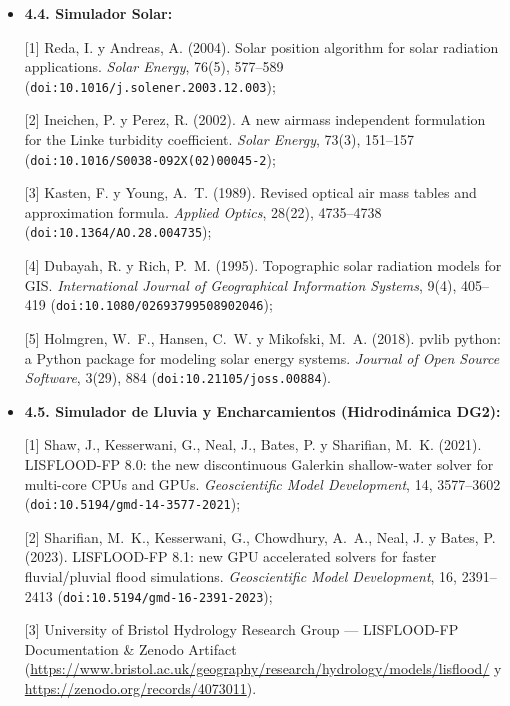 \documentclass[11pt,a4paper]{article}
\begin{document}
{\begin{itemize}
    [4] Hanks, T.~C. y Kanamori, H. (1979). A moment magnitude scale. \emph{Journal of Geophysical Research}, 84(B5), 2348--2350.

    \item \textbf{4.4. Simulador Solar:}

    [1] Reda, I. y Andreas, A. (2004). Solar position algorithm for solar radiation applications. \emph{Solar Energy}, 76(5), 577--589 (\texttt{doi:10.1016/j.solener.2003.12.003});

    [2] Ineichen, P. y Perez, R. (2002). A new airmass independent formulation for the Linke turbidity coefficient. \emph{Solar Energy}, 73(3), 151--157 (\texttt{doi:10.1016/S0038-092X(02)00045-2});

    [3] Kasten, F. y Young, A.~T. (1989). Revised optical air mass tables and approximation formula. \emph{Applied Optics}, 28(22), 4735--4738 (\texttt{doi:10.1364/AO.28.004735});

    [4] Dubayah, R. y Rich, P.~M. (1995). Topographic solar radiation models for GIS. \emph{International Journal of Geographical Information Systems}, 9(4), 405--419 (\texttt{doi:10.1080/02693799508902046});

    [5] Holmgren, W.~F., Hansen, C.~W. y Mikofski, M.~A. (2018). pvlib python: a Python package for modeling solar energy systems. \emph{Journal of Open Source Software}, 3(29), 884 (\texttt{doi:10.21105/joss.00884}).

    \item \textbf{4.5. Simulador de Lluvia y Encharcamientos (Hidrodin\'amica DG2):}

    [1] Shaw, J., Kesserwani, G., Neal, J., Bates, P. y Sharifian, M.~K. (2021). LISFLOOD-FP 8.0: the new discontinuous Galerkin shallow-water solver for multi-core CPUs and GPUs. \emph{Geoscientific Model Development}, 14, 3577--3602 (\texttt{doi:10.5194/gmd-14-3577-2021});

    [2] Sharifian, M.~K., Kesserwani, G., Chowdhury, A.~A., Neal, J. y Bates, P. (2023). LISFLOOD-FP 8.1: new GPU accelerated solvers for faster fluvial/pluvial flood simulations. \emph{Geoscientific Model Development}, 16, 2391--2413 (\texttt{doi:10.5194/gmd-16-2391-2023});

    [3] University of Bristol Hydrology Research Group --- LISFLOOD-FP Documentation \& Zenodo Artifact (\url{https://www.bristol.ac.uk/geography/research/hydrology/models/lisflood/} y \url{https://zenodo.org/records/4073011}).

\end{itemize}

}
\end{document}
